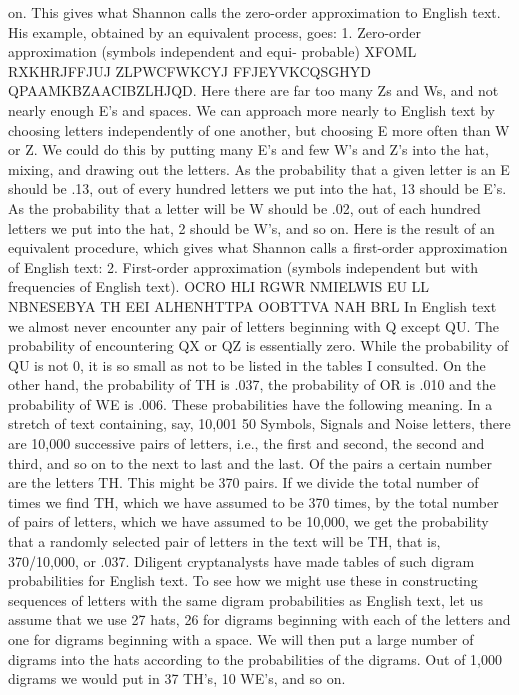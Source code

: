 on. This gives what Shannon calls the zero-order approximation
to English text. His example, obtained by an equivalent process,
goes:
1. Zero-order approximation (symbols independent and equi-
probable)
XFOML RXKHRJFFJUJ ZLPWCFWKCYJ FFJEYVKCQSGHYD
QPAAMKBZAACIBZLHJQD.
Here there are far too many Zs and Ws, and not nearly enough
E’s and spaces. We can approach more nearly to English text by
choosing letters independently of one another, but choosing E
more often than W or Z. We could do this by putting many E’s
and few W’s and Z’s into the hat, mixing, and drawing out the
letters. As the probability that a given letter is an E should be .13,
out of every hundred letters we put into the hat, 13 should be E’s.
As the probability that a letter will be W should be .02, out of each
hundred letters we put into the hat, 2 should be W’s, and so on.
Here is the result of an equivalent procedure, which gives what
Shannon calls a first-order approximation of English text:
2. First-order approximation (symbols independent but with
frequencies of English text).
OCRO HLI RGWR NMIELWIS EU LL NBNESEBYA TH
EEI ALHENHTTPA OOBTTVA NAH BRL
In English text we almost never encounter any pair of letters
beginning with Q except QU. The probability of encountering QX
or QZ is essentially zero. While the probability of QU is not 0, it is
so small as not to be listed in the tables I consulted. On the other
hand, the probability of TH is .037, the probability of OR is .010
and the probability of WE is .006. These probabilities have the
following meaning. In a stretch of text containing, say, 10,001
50
Symbols, Signals and Noise
letters, there are 10,000 successive pairs of letters, i.e., the first and
second, the second and third, and so on to the next to last and the
last. Of the pairs a certain number are the letters TH. This might
be 370 pairs. If we divide the total number of times we find TH,
which we have assumed to be 370 times, by the total number of
pairs of letters, which we have assumed to be 10,000, we get the
probability that a randomly selected pair of letters in the text will
be TH, that is, 370/10,000, or .037.
Diligent cryptanalysts have made tables of such digram probabilities
for English text. To see how we might use these in constructing
sequences of letters with the same digram probabilities
as English text, let us assume that we use 27 hats, 26 for digrams
beginning with each of the letters and one for digrams beginning
with a space. We will then put a large number of digrams into the
hats according to the probabilities of the digrams. Out of 1,000
digrams we would put in 37 TH’s, 10 WE’s, and so on.

